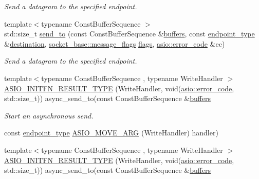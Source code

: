 \begin{DoxyCompactItemize}
\begin{DoxyCompactList}\small\item\em Send a datagram to the specified endpoint. \end{DoxyCompactList}\item 
{\footnotesize template$<$typename Const\+Buffer\+Sequence $>$ }\\std\+::size\+\_\+t \hyperlink{classasio_1_1basic__datagram__socket_a27b44e17e29af7785ab5f9eb7cf6da1d}{send\+\_\+to} (const Const\+Buffer\+Sequence \&\hyperlink{group__async__read_ga54dede45c3175148a77fe6635222c47d}{buffers}, const \hyperlink{classasio_1_1basic__datagram__socket_af952c8d18c85588a16531cfc54a172bb}{endpoint\+\_\+type} \&\hyperlink{classasio_1_1basic__datagram__socket_a63941967078c45fcc3c315ee150070fb}{destination}, \hyperlink{classasio_1_1socket__base_ac3cf77465dfedfe1979b5415cf32cc94}{socket\+\_\+base\+::message\+\_\+flags} \hyperlink{classasio_1_1basic__datagram__socket_a787b917059f9c50a483196d3edaf800c}{flags}, \hyperlink{classasio_1_1error__code}{asio\+::error\+\_\+code} \&ec)
\begin{DoxyCompactList}\small\item\em Send a datagram to the specified endpoint. \end{DoxyCompactList}\item 
{\footnotesize template$<$typename Const\+Buffer\+Sequence , typename Write\+Handler $>$ }\\\hyperlink{classasio_1_1basic__datagram__socket_a3abfc73287c634ef8585aed50ab1f94b}{A\+S\+I\+O\+\_\+\+I\+N\+I\+T\+F\+N\+\_\+\+R\+E\+S\+U\+L\+T\+\_\+\+T\+Y\+P\+E} (Write\+Handler, void(\hyperlink{classasio_1_1error__code}{asio\+::error\+\_\+code}, std\+::size\+\_\+t)) async\+\_\+send\+\_\+to(const Const\+Buffer\+Sequence \&\hyperlink{group__async__read_ga54dede45c3175148a77fe6635222c47d}{buffers}
\begin{DoxyCompactList}\small\item\em Start an asynchronous send. \end{DoxyCompactList}\item 
const \hyperlink{classasio_1_1basic__datagram__socket_af952c8d18c85588a16531cfc54a172bb}{endpoint\+\_\+type} \hyperlink{classasio_1_1basic__datagram__socket_a1f96bbd465e0e8302291ced5330d66e6}{A\+S\+I\+O\+\_\+\+M\+O\+V\+E\+\_\+\+A\+R\+G} (Write\+Handler) handler)
\item 
{\footnotesize template$<$typename Const\+Buffer\+Sequence , typename Write\+Handler $>$ }\\\hyperlink{classasio_1_1basic__datagram__socket_a3abfc73287c634ef8585aed50ab1f94b}{A\+S\+I\+O\+\_\+\+I\+N\+I\+T\+F\+N\+\_\+\+R\+E\+S\+U\+L\+T\+\_\+\+T\+Y\+P\+E} (Write\+Handler, void(\hyperlink{classasio_1_1error__code}{asio\+::error\+\_\+code}, std\+::size\+\_\+t)) async\+\_\+send\+\_\+to(const Const\+Buffer\+Sequence \&\hyperlink{group__async__read_ga54dede45c3175148a77fe6635222c47d}{buffers}

\end{DoxyCompactItemize}

